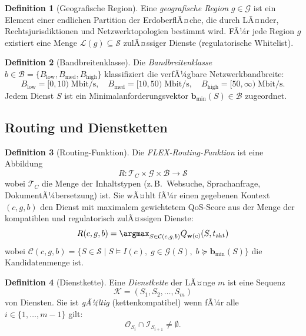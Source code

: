 ﻿\documentclass[a4paper,12pt]{article}
\theoremstyle{definition}
\newtheorem{definition}{Definition}
\begin{document}
\begin{definition}[Geografische Region]
\label{def:region}
Eine \emph{geografische Region} $g \in \mathcal{G}$ ist ein Element einer endlichen Partition der ErdoberflÃ¤che, die durch LÃ¤nder, Rechtsjurisdiktionen und Netzwerktopologien bestimmt wird. FÃ¼r jede Region $g$ existiert eine Menge $\mathcal{L}(g) \subseteq \mathcal{S}$ zulÃ¤ssiger Dienste (regulatorische Whitelist).
\end{definition}

\begin{definition}[Bandbreitenklasse]
\label{def:bandbreite}
Die \emph{Bandbreitenklasse} $b \in \mathcal{B} = \{B_\mathrm{low}, B_\mathrm{med}, B_\mathrm{high}\}$ klassifiziert die verfÃ¼gbare Netzwerkbandbreite:
\[
    B_\mathrm{low} = [0, 10)\;\mathrm{Mbit/s}, \quad
    B_\mathrm{med} = [10, 50)\;\mathrm{Mbit/s}, \quad
    B_\mathrm{high} = [50, \infty)\;\mathrm{Mbit/s}.
\]
Jedem Dienst $S$ ist ein Minimalanforderungsvektor $\mathbf{b}_{\min}(S) \in \mathcal{B}$ zugeordnet.
\end{definition}

\subsection{Routing und Dienstketten}

\begin{definition}[Routing-Funktion]
\label{def:routing}
Die \emph{FLEX-Routing-Funktion} ist eine Abbildung
\[
    R: \mathcal{T}_C \times \mathcal{G} \times \mathcal{B} \to \mathcal{S}
\]
wobei $\mathcal{T}_C$ die Menge der Inhaltstypen (z.\,B.\ Websuche, Sprachanfrage, DokumentÃ¼bersetzung) ist. Sie wÃ¤hlt fÃ¼r einen gegebenen Kontext $(c, g, b)$ den Dienst mit maximalem gewichtetem QoS-Score aus der Menge der kompatiblen und regulatorisch zulÃ¤ssigen Dienste:
\[
    R(c, g, b) = \argmax_{S \in \mathcal{C}(c,g,b)} Q_{\mathbf{w}(c)}(S, t_{\mathrm{akt}})
\]
wobei $\mathcal{C}(c,g,b) = \{S \in \mathcal{S} \mid S \models I(c),\; g \in \mathcal{G}(S),\; b \succeq \mathbf{b}_{\min}(S)\}$ die Kandidatenmenge ist.
\end{definition}

\begin{definition}[Dienstkette]
\label{def:kette}
Eine \emph{Dienstkette} der LÃ¤nge $m$ ist eine Sequenz
\[
    \mathcal{K} = (S_1, S_2, \ldots, S_m)
\]
von Diensten. Sie ist \emph{gÃ¼ltig} (kettenkompatibel) wenn fÃ¼r alle $i \in \{1, \ldots, m-1\}$ gilt:
\[
    \mathcal{O}_{S_i} \cap \mathcal{I}_{S_{i+1}} \neq \emptyset.
\]
\end{definition}
\end{document}
